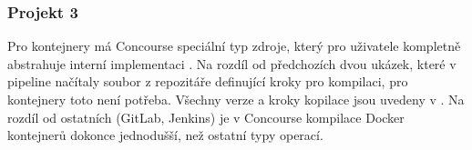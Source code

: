         \subsubsection{Projekt 3}
            Pro kontejnery má Concourse speciální typ zdroje, který pro uživatele kompletně abstrahuje interní implementaci . Na rozdíl od předchozích dvou ukázek, které v pipeline načítaly soubor z repozitáře definující kroky pro kompilaci, pro kontejnery toto není potřeba. Všechny verze a kroky kopilace jsou uvedeny v . Na rozdíl od ostatních \CI (GitLab, Jenkins) je v Concourse kompilace Docker kontejnerů dokonce jednodušší, než ostatní typy operací.
